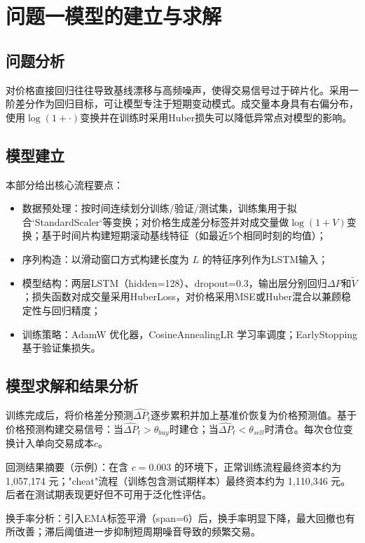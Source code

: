 \documentclass[withoutpreface,bwprint]{cumcmthesis}
\begin{document}
\section{问题一模型的建立与求解}

\subsection{问题分析}

对价格直接回归往往导致基线漂移与高频噪声，使得交易信号过于碎片化。采用一阶差分作为回归目标，可让模型专注于短期变动模式。成交量本身具有右偏分布，使用$\log(1+\cdot)$变换并在训练时采用Huber损失可以降低异常点对模型的影响。

\subsection{模型建立}

本部分给出核心流程要点：
\begin{itemize}
    \item 数据预处理：按时间连续划分训练/验证/测试集，训练集用于拟合`StandardScaler`等变换；对价格生成差分标签并对成交量做$\log(1+V)$变换；基于时间片构建短期滚动基线特征（如最近5个相同时刻的均值）；
    \item 序列构造：以滑动窗口方式构建长度为 $L$ 的特征序列作为LSTM输入；
    \item 模型结构：两层LSTM（hidden=128）、dropout=0.3，输出层分别回归$\Delta P$和$\widetilde{V}$；损失函数对成交量采用HuberLoss，对价格采用MSE或Huber混合以兼顾稳定性与回归精度；
    \item 训练策略：AdamW 优化器，CosineAnnealingLR 学习率调度；EarlyStopping 基于验证集损失。
\end{itemize}

\subsection {模型求解和结果分析}

训练完成后，将价格差分预测$\hat{\Delta P}_t$逐步累积并加上基准价恢复为价格预测值。基于价格预测构建交易信号：当$\hat{\Delta P}_t>\theta_{buy}$时建仓；当$\hat{\Delta P}_t<\theta_{sell}$时清仓。每次仓位变换计入单向交易成本$c$。

回测结果摘要（示例）：在含 $c=0.003$ 的环境下，正常训练流程最终资本约为 1,057,174 元；"cheat"流程（训练包含测试期样本）最终资本约为 1,110,346 元。后者在测试期表现更好但不可用于泛化性评估。

换手率分析：引入EMA标签平滑（span=6）后，换手率明显下降，最大回撤也有所改善；滞后阈值进一步抑制短周期噪音导致的频繁交易。
\end{document}

